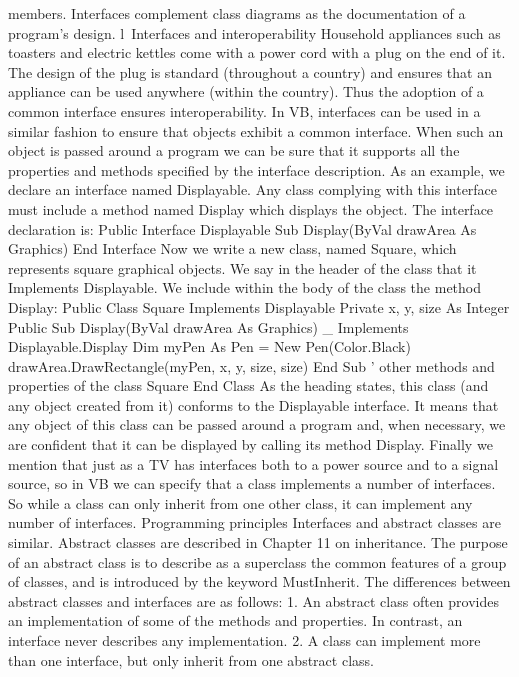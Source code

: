 members. Interfaces complement class diagrams as the documentation of a program’s design.
l Interfaces and interoperability
Household appliances such as toasters and electric kettles come with a power cord 
with a plug on the end of it. The design of the plug is standard (throughout a country) and ensures that an appliance can be used anywhere (within the country). Thus the adoption of a common interface ensures interoperability. In VB, interfaces can be used in a similar fashion to ensure that objects exhibit a common interface. When such an object is passed around a program we can be sure that it supports all the properties and methods speciﬁed by the interface description.
As an example, we declare an interface named Displayable. Any class complying with this interface must include a method named Display which displays the object. The interface declaration is:
Public Interface Displayable
	Sub Display(ByVal drawArea As Graphics)
End Interface
Now we write a new class, named Square, which represents square graphical objects. We say in the header of the class that it Implements Displayable. We include within the body of the class the method Display:
Public Class Square
	Implements Displayable
	Private x, y, size As Integer
	Public Sub Display(ByVal drawArea As Graphics) _
		Implements Displayable.Display
		Dim myPen As Pen = New Pen(Color.Black)
		drawArea.DrawRectangle(myPen, x, y, size, size)
	End Sub
	’ other methods and properties of the class Square
End Class
As the heading states, this class (and any object created from it) conforms to the Displayable interface. It means that any object of this class can be passed around a 
program and, when necessary, we are conﬁdent that it can be displayed by calling its method Display.
Finally we mention that just as a TV has interfaces both to a power source and to a signal source, so in VB we can specify that a class implements a number of interfaces. So while a class can only inherit from one other class, it can implement any number of interfaces.
Programming principles
Interfaces and abstract classes are similar. Abstract classes are described in Chapter 11 on inheritance. The purpose of an abstract class is to describe as a superclass the common features of a group of classes, and is introduced by the keyword MustInherit. The differences between abstract classes and interfaces are as follows:
1.	An abstract class often provides an implementation of some of the methods 
and properties. In contrast, an interface never describes any implementation.
2.	A class can implement more than one interface, but only inherit from one abstract class.
